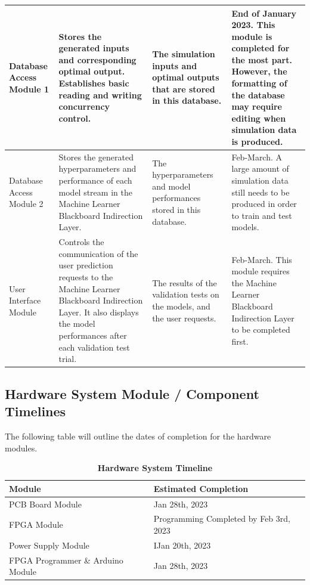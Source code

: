 \documentclass[12pt, titlepage]{article}
\begin{document}
\begin{longtable}{|p{2cm}|p{3cm}|p{3cm}|p{3cm}}
    \hline 
    Database Access Module 1 & Stores the generated inputs and corresponding optimal output. Establishes basic reading and writing concurrency control. & The simulation inputs and optimal outputs that are stored in this database. & End of January 2023. This module is completed for the most part. However, the formatting of the database may require editing when simulation data is produced.\\
    \hline 
    Database Access Module 2 & Stores the generated hyperparameters and performance of each model stream in the Machine Learner Blackboard Indirection Layer. & The hyperparameters and model performances stored in this database. & Feb-March. A large amount of simulation data still needs to be produced in order to train and test models.\\
    \hline 
    User Interface Module & Controls the communication of the user prediction requests to the Machine Learner Blackboard Indirection Layer. It also displays the model performances after each validation test trial. & The results of the validation tests on the models, and the user requests. & Feb-March. This module requires the Machine Learner Blackboard Indirection Layer to be completed first. \\
    \hline 
\end{longtable}
\subsection{Hardware System Module / Component Timelines}
The following table will outline the dates of completion for the hardware modules.
\begin{table}[htp]
  \caption{\bf Hardware System Timeline}
      \begin{tabular}{|p{4cm}|p{4cm}|}
           \hline
           \bf Module & \bf Estimated Completion\\
           \hline
           PCB Board Module & Jan 28th, 2023\\
           \hline
           FPGA Module & Programming Completed by Feb 3rd, 2023\\
           \hline 
           Power Supply Module & IJan 20th, 2023\\
           \hline 
           FPGA Programmer \& Arduino Module & Jan 28th, 2023\\
           \hline 
      \end{tabular}
  \end{table}
\end{document}
